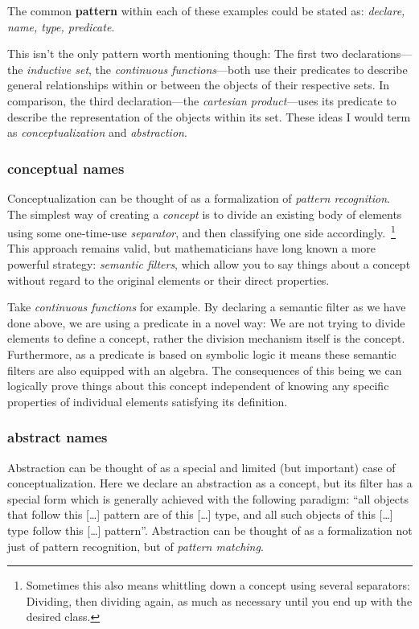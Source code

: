 \documentclass[twoside]{article}
\begin{document}
The common {\bf pattern} within each of these examples could be stated as: \emph{declare, name, type, predicate}.

This isn't the only pattern worth mentioning though: The first two declarations---the \emph{inductive set}, the
\emph{continuous functions}---both use their predicates to describe general relationships within or between the objects
of their respective sets. In comparison, the third declaration---the \emph{cartesian product}---uses its predicate to describe
the representation of the objects within its set. These ideas I would term as \emph{conceptualization} and \emph{abstraction}.

\subsubsection*{conceptual names}

Conceptualization can be thought of as a formalization of \emph{pattern recognition}. The simplest way of creating a
\emph{concept} is to divide an existing body of elements using some one-time-use \emph{separator}, and then classifying
one side accordingly.~\footnote{Sometimes this also means whittling down a concept using several separators: Dividing,
then dividing again, as much as necessary until you end up with the desired class.} This approach remains valid, but
mathematicians have long known a more powerful strategy: \emph{semantic filters}, which allow you to say things about
a concept without regard to the original elements or their direct properties.

Take \emph{continuous functions} for example. By declaring a semantic filter as we have done above, we are using a predicate
in a novel way: We are not trying to divide elements to define a concept, rather the division mechanism itself is the concept.
Furthermore, as a predicate is based on symbolic logic it means these semantic filters are also equipped with an algebra.
The consequences of this being we can logically prove things about this concept independent of knowing any specific properties
of individual elements satisfying its definition.

\subsubsection*{abstract names}

Abstraction can be thought of as a special and limited (but important) case of conceptualization. Here we declare
an abstraction as a concept, but its filter has a special form which is generally achieved with the following paradigm:
``all objects that follow this [\ldots] pattern are of this [\ldots] type, and all such objects of this [\ldots] type follow
this [\ldots] pattern''. Abstraction can be thought of as a formalization not just of pattern recognition, but of
\emph{pattern matching}.
\end{document}
